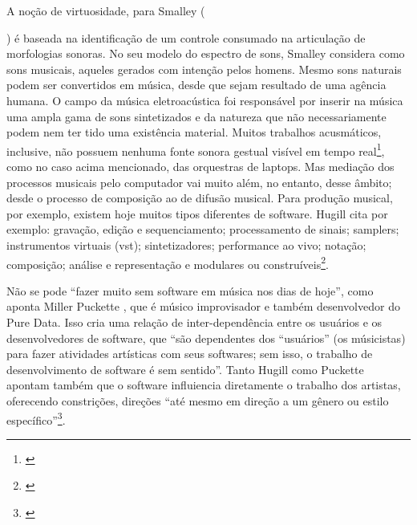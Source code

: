 A noção de virtuosidade, para Smalley ({\citeyear{Smalley1996}) é baseada na identificação de um controle consumado na articulação de morfologias sonoras. No seu modelo do espectro de sons, Smalley considera como sons musicais, aqueles gerados com intenção pelos homens. Mesmo sons naturais podem ser convertidos em música, desde que sejam resultado de uma agência humana. O campo da música eletroacústica foi responsável por inserir na música uma ampla gama de sons sintetizados e da natureza que não necessariamente podem nem ter tido uma existência material. Muitos trabalhos acusmáticos, inclusive, não possuem nenhuma fonte sonora gestual visível em tempo real\footnote{\cite[p. 95, 101]{Smalley1996}}, como no caso acima mencionado, das orquestras de laptops. Mas mediação dos processos musicais pelo computador vai muito além, no entanto, desse âmbito; desde o processo de composição ao de difusão musical. Para produção musical, por exemplo, existem hoje muitos tipos diferentes de software. Hugill \citeyear{Hugill2012} cita por exemplo: gravação, edição e sequenciamento; processamento de sinais; samplers; instrumentos virtuais (vst); sintetizadores; performance ao vivo; notação; composição; análise e representação e modulares ou construíveis\footnote{\cite[p. 195]{Hugill2012}}.


Não se pode ``fazer muito sem software em música nos dias de hoje'', como aponta Miller Puckette \citeyear{PucketteMiller}, que é músico improvisador e também desenvolvedor do Pure Data. Isso cria uma relação de inter-dependência entre os usuários e os desenvolvedores de software, que ``são dependentes dos ``usuários'' (os músicistas) para fazer atividades artísticas com seus softwares; sem isso, o trabalho de desenvolvimento de software é sem sentido''. Tanto Hugill \citeyear{Hugill2012} como Puckette \citeyear{PucketteMiller} apontam também que o software influiencia diretamente o trabalho dos artistas, oferecendo constrições, direções ``até mesmo em direção a um gênero ou estilo específico''\footnote{\cite[p. 195]{Hugill2012}}. 

}
